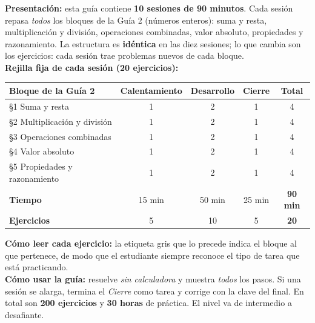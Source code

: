 \documentclass[12pt, letterpaper]{article}
\begin{document}


\vspace{4pt}
\begin{cuadroinfo}
  \small
  \textbf{Presentación:} esta guía contiene \textbf{10 sesiones de 90 minutos}. Cada sesión repasa \emph{todos} los bloques de la Guía 2 (números enteros): suma y resta, multiplicación y división, operaciones combinadas, valor absoluto, propiedades y razonamiento. La estructura es \textbf{idéntica} en las diez sesiones; lo que cambia son los ejercicios: cada sesión trae problemas nuevos de cada bloque.
  \\[4pt]
  \textbf{Rejilla fija de cada sesión (20 ejercicios):}
  \begin{center}
    \small
    \begin{tabular}{@{}l ccc c@{}}
      \toprule
      \textbf{Bloque de la Guía 2} & \textbf{Calentamiento} & \textbf{Desarrollo} & \textbf{Cierre} & \textbf{Total} \\
      \midrule
      §1 Suma y resta                     & 1 & 2 & 1 & 4 \\
      §2 Multiplicación y división        & 1 & 2 & 1 & 4 \\
      §3 Operaciones combinadas           & 1 & 2 & 1 & 4 \\
      §4 Valor absoluto                   & 1 & 2 & 1 & 4 \\
      §5 Propiedades y razonamiento       & 1 & 2 & 1 & 4 \\
      \midrule
      \textbf{Tiempo}                     & 15 min & 50 min & 25 min & \textbf{90 min} \\
      \textbf{Ejercicios}                 & 5 & 10 & 5 & \textbf{20} \\
      \bottomrule
    \end{tabular}
  \end{center}
  \textbf{Cómo leer cada ejercicio:} la etiqueta gris que lo precede indica el bloque al que pertenece, de modo que el estudiante siempre reconoce el tipo de tarea que está practicando.
  \\[4pt]
  \textbf{Cómo usar la guía:} resuelve \emph{sin calculadora} y muestra \emph{todos} los pasos. Si una sesión se alarga, termina el \emph{Cierre} como tarea y corrige con la clave del final. En total son \textbf{200 ejercicios} y \textbf{30 horas} de práctica. El nivel va de \medio{}\hspace{7pt}intermedio a \dificil{}\hspace{7pt}desafiante.
\end{cuadroinfo}
\end{document}
